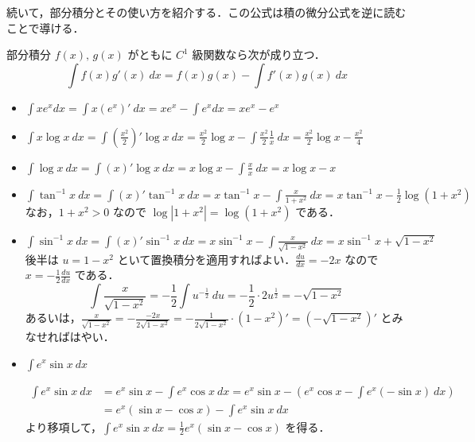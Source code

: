 \documentclass[10pt, uplatex, dvipdfmx]{jsarticle}
\theoremstyle{definition}
\numberwithin{equation}{section}
\newcommand{\ds}{\displaystyle}
\begin{document}
続いて，部分積分とその使い方を紹介する．この公式は積の微分公式を逆に読むことで導ける．
\begin{itembox}[l]{部分積分}
$f(x), \, g(x)$ がともに $C^1$ 級関数なら次が成り立つ．
\[
  \int f(x) g'(x) \ dx = f(x) g(x) - \int f'(x) g(x) \ dx
\]
\end{itembox}

\begin{itemize}
  \setlength{\itemsep}{2zh}
\item $\ds \int x e^x dx = \int x \left( e^{x} \right)' \ dx = x e^x - \int e^x dx = xe^x -e^x $
  
\item $\ds \int x \log x \ dx = \int \left( \frac{x^2}{2} \right)' \log x
      \ dx = \frac{x^2}{2} \log x - \int \frac{x^2}{2} \frac{1}{x} \ dx
      = \frac{x^2}{2}\log x - \frac{x^2}{4} $

\item $\ds \int \log x \ dx
  = \int \left( x \right)' \log x \ dx = x \log x - \int \frac{x}{x} \ dx = x \log x -x $

\item $\ds \int \tan^{-1} x \ dx  =\int \left( x \right)' \tan^{-1} x \ dx =x \tan^{-1}x - \int \frac{x}{1+x^2}\  dx
  =x \tan^{-1}x -\frac{1}{2}\log (1+x^2)$\\

  なお，$1+x^2>0$ なので $\log|1+x^2| = \log(1+x^2)$ である．
  
\item $\ds \int \sin^{-1}x \ dx= \int \left( x \right)' \sin^{-1} x \ dx
    = x \sin^{-1}x - \int \frac{x}{\sqrt{1-x^2}} \ dx = x \sin^{-1} x
    + \sqrt{1-x^2}$\\

    後半は $u=1-x^2$ といて置換積分を適用すればよい．$\ds
    \frac{du}{dx} = -2x$ なので $\ds x= -\frac{1}{2}\frac{du}{dx}$ である．
    \[
      \int \frac{x}{\sqrt{1-x^2}} = -\frac{1}{2}\int u^{-\frac{1}{2}}
      \ du = -\frac{1}{2} \cdot 2 u ^{\frac{1}{2}} = -\sqrt{1-x^2}
    \]
    あるいは，$\ds \frac{x}{\sqrt{1-x^2}} = - \frac{-2x}{2\sqrt{1-x^2}} = -\frac{1}{2\sqrt{1-x^2}}\cdot (1-x^2)'
    = \left(- \sqrt{1-x^2}\right)'$ とみなせればはやい．

\item $\ds \int e^x \sin x \ dx$

  \[
    \begin{aligned}
      \int e^{x} \sin x \ dx &= e^x \sin x - \int e^x \cos x \ dx = 
      e^x \sin x - \left( e^x \cos x - \int e^x (-\sin x) \ dx \right)\\
      &= e^x \left( \sin x - \cos x \right) - \int e^{x} \sin x \ dx
    \end{aligned}
  \]
  より移項して，$\ds \int e^x \sin x \ dx = \frac{1}{2}e^x \left( \sin x - \cos x \right) $ を得る． 
\end{itemize}
\end{document}

